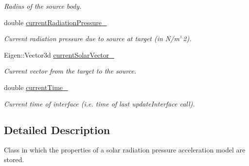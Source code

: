 \begin{DoxyCompactItemize}
\begin{DoxyCompactList}\small\item\em Radius of the source body. \end{DoxyCompactList}\item 
double \hyperlink{classtudat_1_1electro__magnetism_1_1RadiationPressureInterface_a752c46bc8f609515efbd53ecba3fa607}{current\+Radiation\+Pressure\+\_\+}\hypertarget{classtudat_1_1electro__magnetism_1_1RadiationPressureInterface_a752c46bc8f609515efbd53ecba3fa607}{}\label{classtudat_1_1electro__magnetism_1_1RadiationPressureInterface_a752c46bc8f609515efbd53ecba3fa607}

\begin{DoxyCompactList}\small\item\em Current radiation pressure due to source at target (in N/m$^\wedge$2). \end{DoxyCompactList}\item 
Eigen\+::\+Vector3d \hyperlink{classtudat_1_1electro__magnetism_1_1RadiationPressureInterface_a755907cb63f6f57d766fca2e7361623b}{current\+Solar\+Vector\+\_\+}\hypertarget{classtudat_1_1electro__magnetism_1_1RadiationPressureInterface_a755907cb63f6f57d766fca2e7361623b}{}\label{classtudat_1_1electro__magnetism_1_1RadiationPressureInterface_a755907cb63f6f57d766fca2e7361623b}

\begin{DoxyCompactList}\small\item\em Current vector from the target to the source. \end{DoxyCompactList}\item 
double \hyperlink{classtudat_1_1electro__magnetism_1_1RadiationPressureInterface_aa25367b2a6ffa30a0c73a416f1a11e90}{current\+Time\+\_\+}\hypertarget{classtudat_1_1electro__magnetism_1_1RadiationPressureInterface_aa25367b2a6ffa30a0c73a416f1a11e90}{}\label{classtudat_1_1electro__magnetism_1_1RadiationPressureInterface_aa25367b2a6ffa30a0c73a416f1a11e90}

\begin{DoxyCompactList}\small\item\em Current time of interface (i.\+e. time of last update\+Interface call). \end{DoxyCompactList}\end{DoxyCompactItemize}


\subsection{Detailed Description}
Class in which the properties of a solar radiation pressure acceleration model are stored. 

